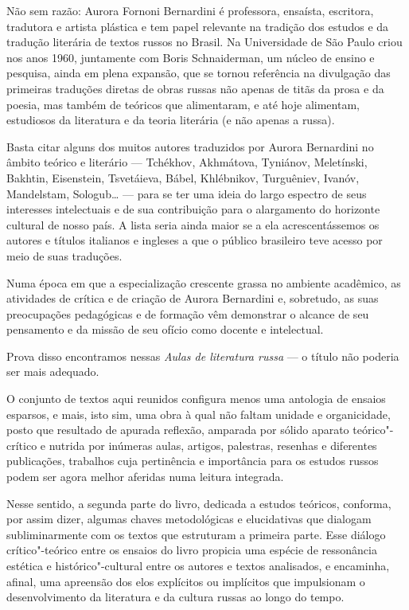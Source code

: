 Não sem razão: Aurora Fornoni Bernardini é professora, ensaísta,
escritora, tradutora e artista plástica e tem papel relevante na
tradição dos estudos e da tradução literária de
textos russos no Brasil. Na Universidade de São Paulo criou nos anos
1960, juntamente com Boris Schnaiderman, um núcleo de ensino e pesquisa,
ainda em plena expansão, que se tornou referência na divulgação das
primeiras traduções diretas de obras russas não apenas de titãs da prosa e da
poesia, mas também de teóricos que alimentaram, e até hoje
alimentam, estudiosos da literatura e da teoria literária (e não apenas
a russa).

Basta citar alguns dos muitos autores traduzidos por Aurora Bernardini
no âmbito teórico e literário --- Tchékhov, Akhmátova, Tyniánov,
Meletínski, Bakhtin, Eisenstein, Tsvetáieva, Bábel,
Khlébnikov, Turguêniev, Ivanóv, Mandelstam, Sologub\ldots{} --- para se ter uma
ideia do largo espectro de seus interesses intelectuais e de sua
contribuição para o alargamento do horizonte cultural de
nosso país. A lista seria ainda maior se a ela acrescentássemos os autores
e títulos italianos e ingleses a que o público brasileiro teve acesso
por meio de suas traduções.

Numa época em que a especialização crescente grassa no ambiente acadêmico, as atividades de crítica e de criação de Aurora
Bernardini e, sobretudo, as suas preocupações pedagógicas e de formação
vêm demonstrar o alcance de seu pensamento e da missão de seu ofício
como docente e intelectual.

Prova disso encontramos nessas \emph{Aulas de literatura russa} --- o título
não poderia ser mais adequado.

O conjunto de textos aqui reunidos configura menos uma antologia de
ensaios esparsos, e mais, isto sim, uma obra à qual não faltam unidade
e organicidade, posto que resultado de apurada reflexão, amparada por
sólido aparato teórico"-crítico e nutrida por inúmeras aulas, artigos, palestras, resenhas
e diferentes publicações, trabalhos cuja pertinência e importância para os estudos russos podem
ser agora melhor aferidas numa leitura integrada.

Nesse sentido, a segunda parte do livro, dedicada a estudos teóricos,
conforma, por assim dizer, algumas chaves metodológicas e
elucidativas que dialogam subliminarmente com os textos que
estruturam a primeira parte. Esse diálogo crítico"-teórico entre
os ensaios do livro propicia uma espécie de ressonância estética e
histórico"-cultural entre os autores e textos analisados, e
encaminha, afinal, uma apreensão dos elos explícitos ou implícitos que
impulsionam o desenvolvimento da literatura e da cultura russas ao longo do
tempo.

